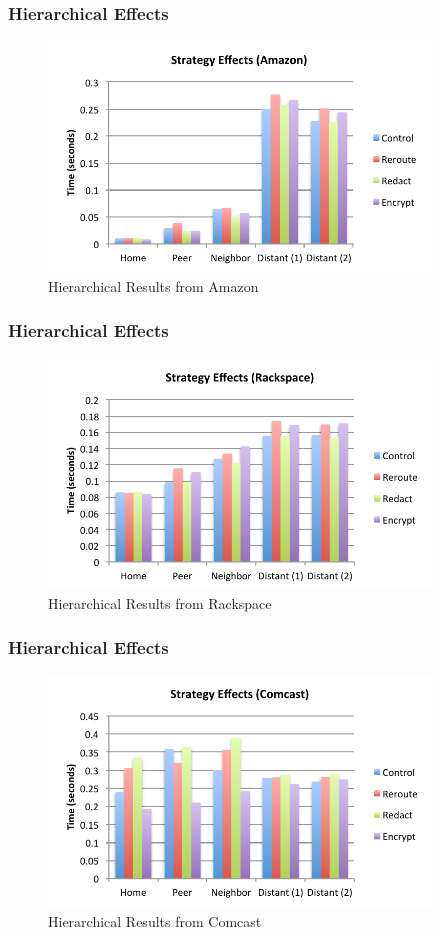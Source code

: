\documentclass[t,handout]{beamer}
\begin{document}
\begin{frame}
\frametitle{Hierarchical Effects}
\begin{figure}[!t]
\centering
\includegraphics[width=4in]{strategy_effects_az}
\caption{Hierarchical Results from Amazon}
\end{figure}
\end{frame}

\begin{frame}
\frametitle{Hierarchical Effects}
\begin{figure}[!t]
\centering
\includegraphics[width=4in]{strategy_effects_rs}
\caption{Hierarchical Results from Rackspace}
\end{figure}
\end{frame}

\begin{frame}
\frametitle{Hierarchical Effects}
\begin{figure}[!t]
\centering
\includegraphics[width=4in]{strategy_effects_local}
\caption{Hierarchical Results from Comcast}
\end{figure}
\end{frame}
\end{document}
